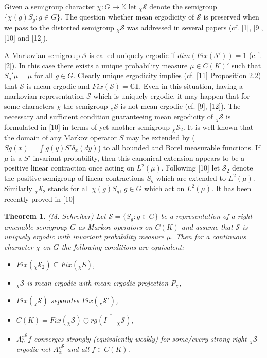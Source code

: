 \documentclass{amsart}
\newtheorem{thm}{Theorem}[section]
\theoremstyle{definition}
\theoremstyle{remark}
\numberwithin{equation}{section}
\begin{document}
Given a semigroup character $\chi : G \to \mathbb{K} $ let $_{\chi}\mathcal{S}$
denote the semigroup $\{ \chi(g)S_g : g\in G\}$. The question whether mean ergodicity
of $\mathcal{S}$ is preserved when we pass to the distorted semigroup $_{\chi}\mathcal{S}$
was addressed in several papers (cf. [1], [9], [10] and [12]).

A Markovian semigroup $\mathcal{S}$ is called uniquely ergodic if
$dim(Fix(\mathcal{S}')) = 1$ (c.f. [2]). In this case there exists a unique probability
measure $\mu \in C(K)'$ such that $S_g'\mu = \mu $ for all $g\in G$. Clearly
unique ergodicity implies (cf. [11] Proposition 2.2) that $\mathcal{S}$ is mean
ergodic and $Fix(\mathcal{S}) = \mathbb{C}\mathbf{1}$. Even in this
situation, having a markovian representation $\mathcal{S}$ which is uniquely ergodic,
it may happen that for some characters $\chi $ the semigroup
$_{\chi}\mathcal{S}$  is not mean ergodic (cf. [9], [12]). The necessary and sufficient
condition guaranteeing mean ergodicity of $_{\chi}\mathcal{S}$ is formulated
in [10] in terms of yet another semigroup $_{\chi}\mathcal{S}_2$.
It is well known that the domain of any Markov operator $S$ may be  extended
by ($Sg(x) = \int g(y) S'\delta_x(dy)$)  to  all bounded and Borel measurable functions.
If $\mu $ is a $S'$ invariant probability, then this canonical extension appears to be a positive
linear contraction once acting on $L^2(\mu)$. Following [10] let $\mathcal{S}_2$ denote
the positive semigroup of linear contractions $S_g$ which are extended to $L^2(\mu )$.
Similarly $_{\chi}\mathcal{S}_2$ stands for all $\chi(g)S_g$, $g\in G$ which act
on $L^2(\mu )$. It has been recently proved in [10]

\begin{thm} (M. Schreiber) Let $\mathcal{S} = \{ S_g : g\in G \}$ be a
representation of a right amenable semigroup $G$ as Markov operators on
$C(K)$ and assume that $\mathcal{S}$ is uniquely ergodic with invariant
probability measure $\mu $. Then for a continuous character $\chi $ on $G$
the following conditions are equivalent:
\begin{itemize}
\item[(1)] $Fix(_{\chi}\mathcal{S}_2 ) \subseteq Fix(_{\chi}S)$,
\item[(2)] $_{\chi}\mathcal{S}$ is mean ergodic with mean ergodic projection $P_{\chi}$,
\item[(3)] $Fix(\mathcal{_{\chi}S})$ separates $Fix(_{\chi}\mathcal{S}')$,
\item[(3)] $C(K) = Fix(_{\chi}\mathcal{S})\oplus \overline{rg(I - \ _{\chi}\mathcal{S})} $,
\item[(4)] $A_{\alpha}^{_{\chi}\mathcal{S}}f$ converges strongly (equivalently weakly)
for some/every strong right $_{\chi}\mathcal{S}$-ergodic net $A_{\alpha}^{_{\chi}\mathcal{S}}$
and all $f\in C(K)$.
\end{itemize}
\end{thm}
\end{document}
